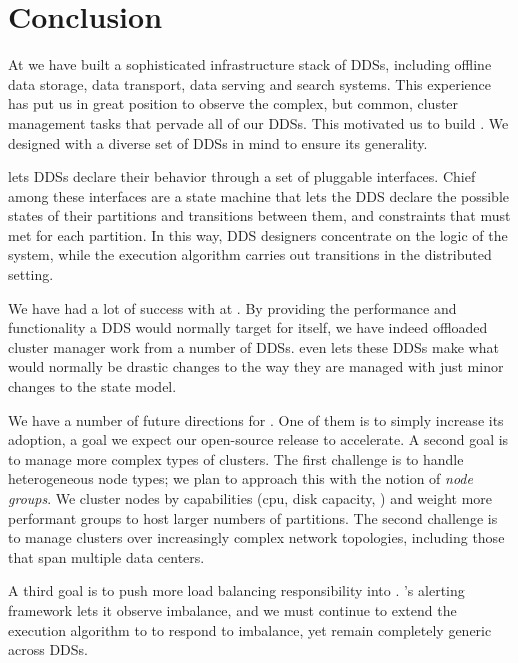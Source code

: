 \section{Conclusion}
\label{sec:conclusion}
%
At \linkedin we have built a sophisticated infrastructure stack of DDSs, including
offline data storage, data transport, data serving and search systems.  This
experience has put us in great position to observe the complex, but common,
cluster management tasks that pervade all of our DDSs.  This motivated us to
build \helix.  We designed \helix with a diverse set of DDSs in mind to ensure
its generality.

\helix lets DDSs declare their behavior through a set of pluggable interfaces.
Chief among these interfaces are a state machine that lets the DDS declare the
possible states of their partitions and transitions between them, and constraints 
that must met for each partition.  In this way, DDS designers concentrate on
the logic of the system, while the \helix execution algorithm carries out transitions in the distributed
setting.  

We have had a lot of success with \helix at \linkedin.  By providing the
performance and functionality a DDS would normally target for itself, we have indeed
offloaded cluster manager work from a number of DDSs.  \helix even lets these DDSs
make what would normally be drastic changes to the way they are managed with
just minor changes to the \helix state model.    

We have a number of future directions for \helix.  One of them is to simply
increase its adoption, a goal we expect our open-source release to accelerate.
A second goal is to manage more complex types of clusters.  The first challenge
is to handle heterogeneous node types; we plan to approach this with the notion
of \emph{node groups}.  We cluster nodes by capabilities (cpu, disk capacity,
\etc) and weight more performant groups to host larger numbers of partitions. 
The second challenge is to manage clusters over increasingly complex network
topologies, including those that span multiple data centers.  

A third goal is to push more load balancing responsibility into \helix.  \helix's
alerting framework lets it observe imbalance, and we must continue to extend the
\helix execution algorithm to to respond to imbalance, yet remain completely
generic across DDSs. 

